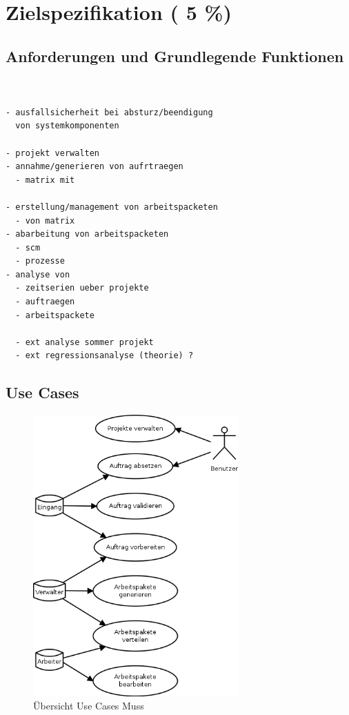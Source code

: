 \chapter{Zielspezifikation ( 5 \%)}





\section{Anforderungen und Grundlegende Funktionen}

\begin{verbatim}


- ausfallsicherheit bei absturz/beendigung
  von systemkomponenten

- projekt verwalten
- annahme/generieren von aufrtraegen
  - matrix mit

- erstellung/management von arbeitspacketen
  - von matrix
- abarbeitung von arbeitspacketen
  - scm
  - prozesse
- analyse von
  - zeitserien ueber projekte
  - auftraegen
  - arbeitspackete

  - ext analyse sommer projekt
  - ext regressionsanalyse (theorie) ?
\end{verbatim}

\section{Use Cases}



\begin{figure}[ht]
  \label{fig:use-case-muss}
  \begin{center}
      \includegraphics[width=0.7\textwidth]{imageinput/use-case-muss.png}
  \end{center}
  \caption{\"Ubersicht Use Cases Muss}
\end{figure}


